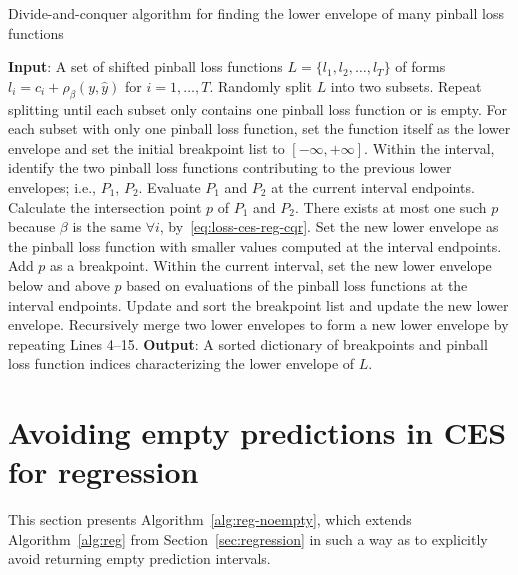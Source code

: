 \begin{algorithm}[H]
    \caption{Divide-and-conquer algorithm for finding the lower envelope of many pinball loss functions}
    \label{alg:envelope-cqr}
    \begin{algorithmic} [1]
        \STATE \textbf{Input}: A set of shifted pinball loss functions $L = \{l_1, l_2, \dots, l_T \}$ of forms $l_i = c_i + \rho_\beta(y, \hat{y})$ for $i=1,\dots, T$.
        \STATE Randomly split $L$ into two subsets. Repeat splitting until each subset only contains one pinball loss function or is empty.
        \STATE For each subset with only one pinball loss function, set the function itself as the lower envelope and set the initial breakpoint list to $[-\infty, +\infty]$.
            \STATE Within the interval, identify the two pinball loss functions contributing to the previous lower envelopes; i.e., $P_1$, $P_2$.
            \STATE Evaluate $P_1$ and $P_2$ at the current interval endpoints.
            \STATE Calculate the intersection point $p$ of $P_1$ and $P_2$. There exists at most one such $p$ because $\beta$ is the same $\forall i$, by~\eqref{eq:loss-ces-reg-cqr}.
            \STATE Set the new lower envelope as the pinball loss function with smaller values computed at the interval endpoints.
            \ELSE \STATE Add $p$ as a breakpoint.
            \STATE Within the current interval, set the new lower envelope below and above $p$ based on evaluations of the pinball loss functions at the interval endpoints.
            \ENDIF
            \STATE Update and sort the breakpoint list and update the new lower envelope.
        \ENDFOR
        \STATE Recursively merge two lower envelopes to form a new lower envelope by repeating Lines 4--15.
        \STATE \textbf{Output}: A sorted dictionary of breakpoints and pinball loss function indices characterizing the lower envelope of $L$.
\end{algorithmic}
\end{algorithm}



\section{Avoiding empty predictions in CES for regression} \label{app:reg-noempty}

This section presents Algorithm~\ref{alg:reg-noempty}, which extends Algorithm~\ref{alg:reg} from Section~\ref{sec:regression} in such a way as to explicitly avoid returning empty prediction intervals.

